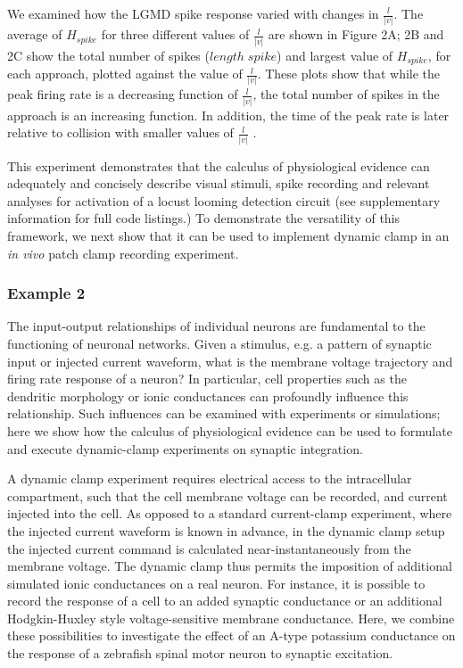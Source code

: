 \documentclass[11pt]{article}
\newcommand{\Varid}[1]{\mathit{#1}}
\begin{document}
We examined how the LGMD spike response varied with changes in
$\frac{l}{|v|}$. The average of \ensuremath{H_{spike}} for three different values
of $\frac{l}{|v|}$ are shown in Figure 2A; 2B and 2C show the total
number of spikes (\ensuremath{\Varid{length}\;\Varid{spike}}) and largest value of \ensuremath{H_{spike}}, for
each approach, plotted against the value of $\frac{l}{|v|}$. These
plots show that while the peak firing rate is a decreasing function of
$\frac{l}{|v|}$, the total number of spikes in the approach is an
increasing function. In addition, the time of the peak rate is later
relative to collision with smaller values of $\frac{l}{|v|}$
\cite{Hatsopoulos1995}.

This experiment demonstrates that the calculus of physiological
evidence can adequately and concisely describe visual stimuli, spike
recording and relevant analyses for activation of a locust looming
detection circuit (see supplementary information for full code
listings.) To demonstrate the versatility of this framework, we next
show that it can be used to implement dynamic clamp in an \emph{in
  vivo} patch clamp recording experiment.

\subsubsection*{Example 2}

The input-output relationships of individual neurons are fundamental to
the functioning of neuronal networks. Given a stimulus, e.g. a pattern
of synaptic input or injected current waveform, what is the membrane
voltage trajectory and firing rate response of a neuron? In
particular, cell properties such as the dendritic morphology or ionic
conductances can profoundly influence this relationship. Such
influences can be examined with experiments or simulations; here we
show how the calculus of physiological evidence can be used to
formulate and execute dynamic-clamp experiments on synaptic
integration.

A dynamic clamp experiment \cite{Robinson1993, Sharp1993} requires
electrical access to the intracellular compartment, such that the cell
membrane voltage can be recorded, and current injected into the
cell. As opposed to a standard current-clamp experiment, where the
injected current waveform is known in advance, in the dynamic clamp
setup the injected current command is calculated near-instantaneously
from the membrane voltage. The dynamic clamp thus permits the
imposition of additional simulated ionic conductances on a real
neuron. For instance, it is possible to record the response of a cell
to an added synaptic conductance or an additional Hodgkin-Huxley style
voltage-sensitive membrane conductance. Here, we combine these
possibilities to investigate the effect of an A-type potassium
conductance \cite{Connor1971} on the response of a zebrafish spinal
motor neuron to synaptic excitation.
\end{document}
